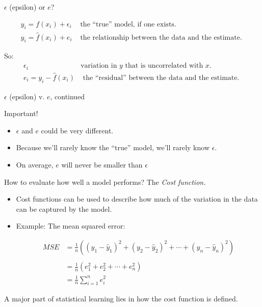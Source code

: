 \documentclass[aspectratio=169]{beamer}
\begin{document}
\begin{frame}{$\epsilon$ (epsilon) or $e$?}

\begin{eqnarray*}
y_i = f(x_i) + \epsilon_i & \text{ the ``true'' model, if one exists. }\\
y_i = \hat{f}(x_i) + e_i & \text{ the relationship between the data and the estimate. }
\end{eqnarray*}

\hspace{5mm}
\pause

So:
\begin{eqnarray*}
\epsilon_i&\text{variation in $y$ that is uncorrelated with $x$.}\\
e_i = y_i - \hat{f}(x_i) & \text{ the ``residual'' between the data and the estimate. }
\end{eqnarray*}

\end{frame}

\begin{frame}{$\epsilon$ (epsilon) v. $e$, continued}

Important!  
\begin{itemize}
\item $\epsilon$ and $e$ could be very different.  
\item Because we'll rarely know the ``true'' model, we'll rarely know $\epsilon$.
\item On average, $e$ will never be smaller than $\epsilon$
\end{itemize}
\end{frame}

\begin{frame}{How to evaluate how well a model performs? The \textit{Cost function.}}


\begin{itemize}
\item Cost functions can be used to describe how much of the variation in the data can be captured by the model.
\item Example: The mean squared error:

\pause 
\begin{align*}
MSE &= \frac{1}{n} ((y_1 - \hat{y}_1)^2 + (y_2 - \hat{y}_2)^2 + \cdots + (y_n - \hat{y}_n)^2) \\\\
&= \frac{1}{n} (e_1^2 + e_2^2 + \cdots + e_n^2) \\
&=\frac{1}{n} \sum_{i=1}^n e_i^2
\end{align*}
\end{itemize}

\pause
A major part of statistical learning lies in how the cost function is defined.

\end{frame}
\end{document}
